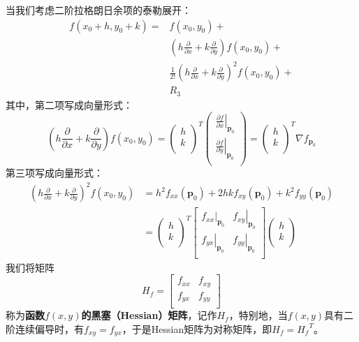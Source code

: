 当我们考虑二阶拉格朗日余项的泰勒展开：
\begin{align*}
f\left( x_0+h,y_0+k \right) =&f\left( x_0,y_0 \right) + \\
&\left( h\frac{\partial}{\partial x}+k\frac{\partial}{\partial y} \right) f\left( x_0,y_0 \right) + \\
&\frac{1}{2!}\left( h\frac{\partial}{\partial x}+k\frac{\partial}{\partial y} \right) ^2f\left( x_0,y_0 \right) + \\
&R_3
\end{align*}
其中，第二项写成向量形式：
\[
\left( h\frac{\partial}{\partial x}+k\frac{\partial}{\partial y} \right) f\left( x_0,y_0 \right) =\left( \begin{array}{c}
	h\\
	k\\
\end{array} \right) ^T\left( \begin{array}{c}
	\left. \frac{\partial f}{\partial x} \right|_{\boldsymbol{p}_0}\\
	\left. \frac{\partial f}{\partial y} \right|_{\boldsymbol{p}_0}\\
\end{array} \right) =\left( \begin{array}{c}
	h\\
	k\\
\end{array} \right) ^T\nabla f_{\boldsymbol{p}_0}
\]
第三项写成向量形式：
\begin{align*}
\left( h\frac{\partial}{\partial x}+k\frac{\partial}{\partial y} \right) ^2f\left( x_0,y_0 \right) &=h^2f_{xx}\left( \boldsymbol{p}_0 \right) +2hkf_{xy}\left( \boldsymbol{p}_0 \right) +k^2f_{yy}\left( \boldsymbol{p}_0 \right) \\
&=\left( \begin{array}{c}
	h\\
	k\\
\end{array} \right) ^T\left[ \begin{matrix}
	\left. f_{xx} \right|_{\boldsymbol{p}_0}&		\left. f_{xy} \right|_{\boldsymbol{p}_0}\\
	\left. f_{yx} \right|_{\boldsymbol{p}_0}&		\left. f_{yy} \right|_{\boldsymbol{p}_0}\\
\end{matrix} \right] \left( \begin{array}{c}
	h\\
	k\\
\end{array} \right)
\end{align*}
我们将矩阵
\[
H_f=\left[ \begin{matrix}
	f_{xx}&		f_{xy}\\
	f_{yx}&		f_{yy}\\
\end{matrix} \right]
\]
称为{\bf 函数$f\left( x,y \right) $的黑塞（Hessian）矩阵}，记作$H_f$，特别地，当$f\left( x,y \right) $具有二阶连续偏导时，有$f_{xy}=f_{yx}$，于是Hessian矩阵为对称矩阵，即$H_f={H_f}^T$。


